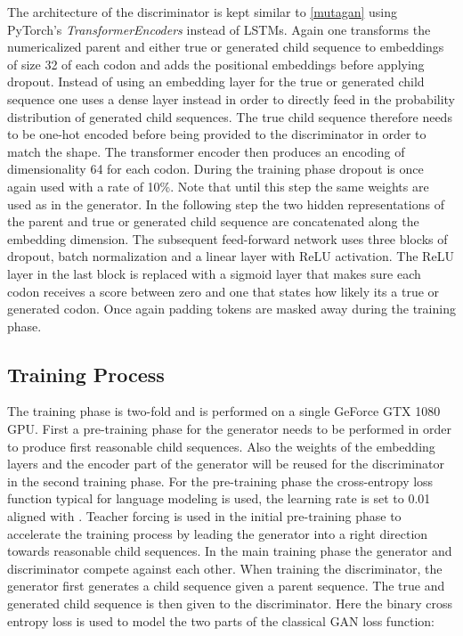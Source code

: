 The architecture of the discriminator is kept similar to \autoref{mutagan} using PyTorch's \textit{TransformerEncoders} instead of \acp{LSTM}. Again one transforms the numericalized parent and either true or generated child sequence to embeddings of size 32 of each codon and adds the positional embeddings before applying dropout. Instead of using an embedding layer for the true or generated child sequence one uses a dense layer instead in order to directly feed in the probability distribution of generated child sequences. The true child sequence therefore needs to be one-hot encoded before being provided to the discriminator in order to match the shape. The transformer encoder then produces an encoding of dimensionality 64 for each codon. During the training phase dropout is once again used with a rate of 10\%. Note that until this step the same weights are used as in the generator. In the following step the two hidden representations of the parent and true or generated child sequence are concatenated along the embedding dimension. The subsequent feed-forward network uses three blocks of dropout, batch normalization and a linear layer with \ac{ReLU} activation. The \ac{ReLU} layer in the last block is replaced with a sigmoid layer that makes sure each codon receives a score between zero and one that states how likely its a true or generated codon. Once again padding tokens are masked away during the training phase.

\subsection{Training Process} \label{ch:approachD}

The training phase is two-fold and is performed on a single GeForce GTX 1080 \ac{GPU}. First a pre-training phase for the generator needs to be performed in order to produce first reasonable child sequences. Also the weights of the embedding layers and the encoder part of the generator will be reused for the discriminator in the second training phase. For the pre-training phase the cross-entropy loss function typical for language modeling is used, the learning rate is set to 0.01 aligned with \cite{Berman2020}. Teacher forcing is used in the initial pre-training phase to accelerate the training process by leading the generator into a right direction towards reasonable child sequences. In the main training phase the generator and discriminator compete against each other. When training the discriminator, the generator first generates a child sequence given a parent sequence. The true and generated child sequence is then given to the discriminator. Here the binary cross entropy loss is used to model the two parts of the classical \ac{GAN} loss function: 

